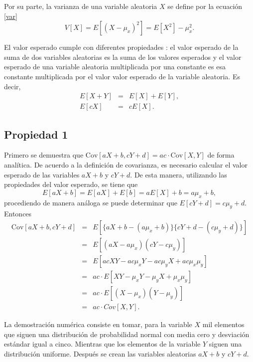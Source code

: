 \documentclass[12pt]{article}
\begin{document}
	Por su parte, la varianza de una variable aleatoria $X$ se define por la ecuación \ref{var}
	\begin{equation}
	V[X] = E[(X - \mu_x)^2] = E[X^2] - \mu_x^2.
	\label{var}
	\end{equation}
	
	El valor esperado cumple con diferentes propiedades \cite{prob2003}: el valor esperado de la suma de dos variables aleatorias es la suma de los valores esperados y el valor esperado de una variable aleatoria multiplicada por una constante es esa constante multiplicada por el valor valor esperado de la variable aleatoria. Es decir,
	\begin{eqnarray}
	E[X + Y] &=& E[X] + E[Y], \label{esuma}\\
	E[cX] &=& cE[X] \label{econst}.
	\end{eqnarray} 
	
	\subsection{Propiedad 1}
	
	Primero se demuestra que $\text{Cov}[aX+b, cY+d] = ac \cdot \text{Cov}[X,Y]$ de forma analítica. De acuerdo a la definición de covarianza, es necesario calcular el valor esperado de las variables $aX+b$ y $cY+d$. De esta manera, utilizando las propiedades del valor esperado, se tiene que
	\begin{equation*}
	E[aX+b] = E[aX]+ E[b] = aE[X] + b = a\mu_x + b,
	\end{equation*}
	procediendo de manera análoga se puede determinar que $E[cY+d] = c\mu_y + d$. Entonces
	\begin{eqnarray*}
		\text{Cov}[aX+b, cY+d] &=& E[\{aX+b - (a\mu_x + b)\}\{cY+d - (c\mu_y + d)\}] \\
		&=& E[(aX - a\mu_x) (cY - c\mu_y)] \\	
		&=& E[acXY - ac\mu_xY - ac\mu_yX + ac\mu_x\mu_y] \\
		&=& ac \cdot E[XY - \mu_xY - \mu_yX + \mu_x\mu_y] \\
		&=& ac \cdot E[(X - \mu_x)(Y - \mu_y)] \\
		&=& ac \cdot Cov[X,Y].
	\end{eqnarray*}

	La demostración numérica consiste en tomar, para la variable $X$ mil elementos que siguen una distribución de probabilidad normal con media cero y desviación estándar igual a cinco. Mientras que los elementos de la variable $Y$ siguen una distribución uniforme. Después se crean las variables aleatorias $aX+b$ y $cY+d$. 
	
\end{document}

